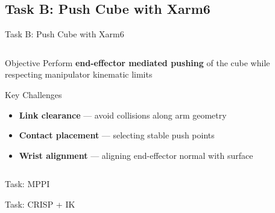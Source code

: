 \documentclass[10pt, aspectratio=169]{beamer}
\begin{document}
\subsection{Task B: Push Cube with Xarm6}
\begin{frame}{Task B: Push Cube with Xarm6}
  \begin{columns}[T]
    \begin{column}{0.6\textwidth}
      \begin{block}{Objective}
        Perform \textbf{end-effector mediated pushing} of the cube while respecting manipulator kinematic limits
      \end{block}

      \vspace{1em}

      \begin{block}{Key Challenges}
        \begin{itemize}
          \item \textbf{Link clearance} — avoid collisions along arm geometry  
          \item \textbf{Contact placement} — selecting stable push points
          \item \textbf{Wrist alignment} — aligning end-effector normal with surface
        \end{itemize}
      \end{block}
    \end{column}

    \begin{column}{0.4\textwidth}
    \end{column}
  \end{columns}
\end{frame}

\begin{frame}{Task: MPPI}
\end{frame}
\begin{frame}{Task: CRISP + IK}
\end{frame}

\end{document}
